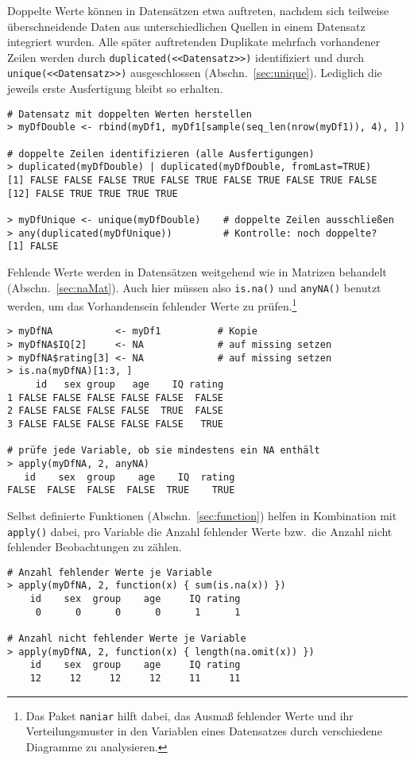 Doppelte Werte können in Datensätzen etwa auftreten, nachdem sich teilweise überschneidende Daten aus unterschiedlichen Quellen in einem Datensatz integriert wurden. Alle später auftretenden Duplikate mehrfach vorhandener Zeilen werden durch \lstinline!duplicated(<<Datensatz>>)! identifiziert und durch \lstinline!unique(<<Datensatz>>)! ausgeschlossen (Abschn.\ \ref{sec:unique}). Lediglich die jeweils erste Ausfertigung bleibt so erhalten.
\begin{lstlisting}
# Datensatz mit doppelten Werten herstellen
> myDfDouble <- rbind(myDf1, myDf1[sample(seq_len(nrow(myDf1)), 4), ])

# doppelte Zeilen identifizieren (alle Ausfertigungen)
> duplicated(myDfDouble) | duplicated(myDfDouble, fromLast=TRUE)
[1] FALSE FALSE FALSE TRUE FALSE TRUE FALSE TRUE FALSE TRUE FALSE
[12] FALSE TRUE TRUE TRUE TRUE

> myDfUnique <- unique(myDfDouble)    # doppelte Zeilen ausschließen
> any(duplicated(myDfUnique))         # Kontrolle: noch doppelte?
[1] FALSE
\end{lstlisting}

Fehlende Werte werden in Datensätzen weitgehend wie in Matrizen behandelt (Abschn.\ \ref{sec:naMat}). Auch hier müssen also \lstinline!is.na()! und \lstinline!anyNA()! benutzt werden, um das Vorhandensein fehlender Werte zu prüfen.\footnote{Das Paket \lstinline!naniar! \cite{Tierney2019} hilft dabei, das Ausmaß fehlender Werte und ihr Verteilungsmuster in den Variablen eines Datensatzes durch verschiedene Diagramme zu analysieren.}
\begin{lstlisting}
> myDfNA           <- myDf1          # Kopie
> myDfNA$IQ[2]     <- NA             # auf missing setzen
> myDfNA$rating[3] <- NA             # auf missing setzen
> is.na(myDfNA)[1:3, ]
     id   sex group   age    IQ rating
1 FALSE FALSE FALSE FALSE FALSE  FALSE
2 FALSE FALSE FALSE FALSE  TRUE  FALSE
3 FALSE FALSE FALSE FALSE FALSE   TRUE

# prüfe jede Variable, ob sie mindestens ein NA enthält
> apply(myDfNA, 2, anyNA)
   id    sex  group    age    IQ  rating
FALSE  FALSE  FALSE  FALSE  TRUE    TRUE
\end{lstlisting}

Selbst definierte Funktionen (Abschn.\ \ref{sec:function}) helfen in Kombination mit \lstinline!apply()! dabei, pro Variable die Anzahl fehlender Werte bzw.\ die Anzahl nicht fehlender Beobachtungen zu zählen.
\begin{lstlisting}
# Anzahl fehlender Werte je Variable
> apply(myDfNA, 2, function(x) { sum(is.na(x)) })
    id    sex  group    age     IQ rating 
     0      0      0      0      1      1 

# Anzahl nicht fehlender Werte je Variable
> apply(myDfNA, 2, function(x) { length(na.omit(x)) })
    id    sex  group    age     IQ rating 
    12     12     12     12     11     11 
\end{lstlisting}

